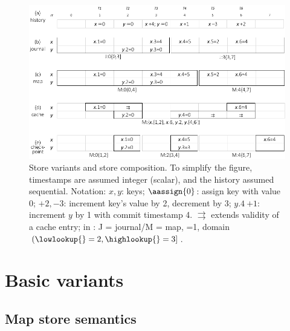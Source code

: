 \begin{figure}[tp]
  \centering
  \includegraphics[width=.5\textwidth]{figures/systor-variants-and-composition.png}
  \caption[Store variants and store composition]{
    Store variants and store composition.
    To simplify the figure, timestamps are assumed integer (scalar), and
    the history assumed sequential.
    Notation: $x,y$: keys; $\aassign{0}$: assign key with value 0;
    $+2, -3$: increment  key's value by 2, decrement by 3;
    $y.4~{+1}$: increment $y$ by 1 with commit timestamp 4.
    $\rightrightarrows$ extends validity of a cache entry; in
    : J = journal{\slash}M = map,
    \lowhistory{}=1, domain $(\lowlookup{}=2, \highlookup{}=3]$.
}
  \label{fig:variants-and-composition}
\end{figure}

\section{Basic variants}
\label{sec:basic}

\subsection{Map store semantics}
\label{sec:map-store-variant}

